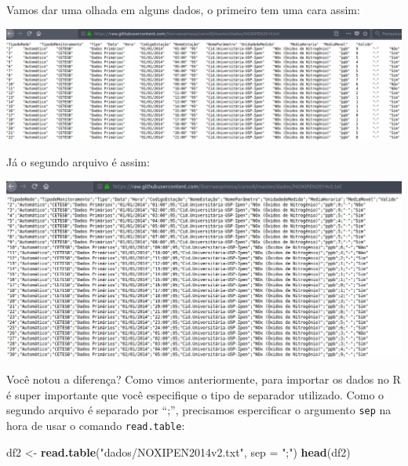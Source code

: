 \documentclass[]{book}
\newenvironment{Shaded}{\begin{snugshade}}{\end{snugshade}}
\newcommand{\KeywordTok}[1]{\textcolor[rgb]{0.13,0.29,0.53}{\textbf{#1}}}
\newcommand{\DataTypeTok}[1]{\textcolor[rgb]{0.13,0.29,0.53}{#1}}
\newcommand{\StringTok}[1]{\textcolor[rgb]{0.31,0.60,0.02}{#1}}
\newcommand{\NormalTok}[1]{#1}
\theoremstyle{definition}
\theoremstyle{definition}
\theoremstyle{definition}
\theoremstyle{remark}
\begin{document}
Vamos dar uma olhada em alguns dados, o primeiro tem uma cara assim:

\includegraphics[width=18.47in]{figuras/f1}

Já o segundo arquivo é assim:

\includegraphics[width=15.33in]{figuras/f2}

Você notou a diferença? Como vimos anteriormente, para importar os dados
no R é super importante que você especifique o tipo de separador
utilizado. Como o segundo arquivo é separado por ``;'', precisamos
espercificar o argumento \texttt{sep} na hora de usar o comando
\texttt{read.table}:

\begin{Shaded}
\begin{Highlighting}[]
\NormalTok{df2 <-}\StringTok{ }\KeywordTok{read.table}\NormalTok{(}\StringTok{"dados/NOXIPEN2014v2.txt"}\NormalTok{, }\DataTypeTok{sep =} \StringTok{";"}\NormalTok{)}
\KeywordTok{head}\NormalTok{(df2)}
\end{Highlighting}
\end{Shaded}
\end{document}
